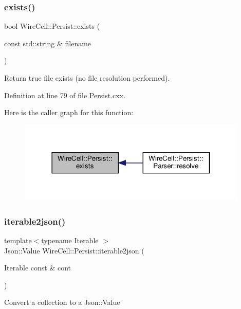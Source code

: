 \subsubsection{\texorpdfstring{exists()}{exists()}}
{\footnotesize\ttfamily bool Wire\+Cell\+::\+Persist\+::exists (\begin{DoxyParamCaption}\item[{const std\+::string \&}]{filename }\end{DoxyParamCaption})}



Return true file exists (no file resolution performed). 



Definition at line 79 of file Persist.\+cxx.

Here is the caller graph for this function\+:
\nopagebreak
\begin{figure}[H]
\begin{center}
\leavevmode
\includegraphics[width=310pt]{namespace_wire_cell_1_1_persist_a3b9a35a2580c04da89629682d43eae40_icgraph}
\end{center}
\end{figure}
\mbox{\label{namespace_wire_cell_1_1_persist_a5a19d242eec54e2353002379147473ad}} 
\subsubsection{\texorpdfstring{iterable2json()}{iterable2json()}}
{\footnotesize\ttfamily template$<$typename Iterable $>$ \\
Json\+::\+Value Wire\+Cell\+::\+Persist\+::iterable2json (\begin{DoxyParamCaption}\item[{Iterable const \&}]{cont }\end{DoxyParamCaption})}

Convert a collection to a Json\+::\+Value 

